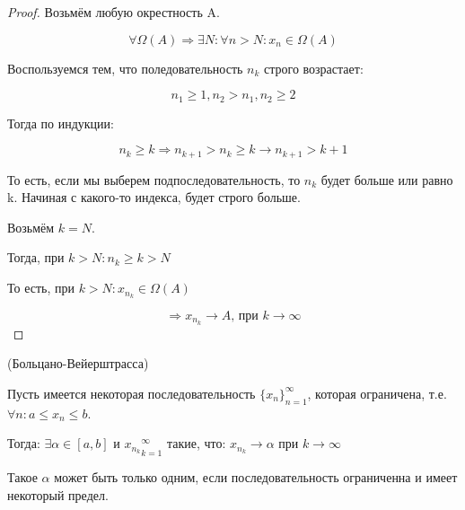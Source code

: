 \begin{proof}
    Возьмём любую окрестность A.

    \[ \forall \Omega (A) \Rightarrow \exists N: \forall n > N: x_n \in \Omega (A) \]

    Воспользуемся тем, что поледовательность $n_k$ строго возрастает:

    \[n_1 \geq 1, n_2 > n_1, n_2 \geq 2 \]

    Тогда по индукции:

    \[n_k \geq k \Rightarrow n_{k + 1} > n_k \geq k \rightarrow n_{k + 1} > k+1\]

    То есть, если мы выберем подпоследовательность, то $n_k$ будет больше или равно k. Начиная с какого-то индекса, будет строго больше.

    Возьмём $k = N$.

    Тогда, при $k > N: n_k \geq k > N$

    То есть, при $k > N: x_{n_k} \in \Omega (A)$

    \[\Rightarrow x_{n_k} \to A \text{, при $k \to \infty$} \]
\end{proof}


\begin{theorem}(Больцано-Вейерштрасса)


    Пусть имеется некоторая последовательность $\{x_n\}_{n=1}^\infty$, которая ограничена, т.е. $\forall n: a \leq x_n \leq b$.
    
    Тогда: $\exists \alpha \in [a, b] \text{ и } {x_{n_k}}_{k=1}^\infty$ такие, что: $x_{n_k} \to \alpha \text{ при } k \to \infty  $

    \begin{remark}
        Такое $\alpha$ может быть только одним, если последовательность ограниченна и имеет некоторый предел.
    \end{remark}

\end{theorem}

